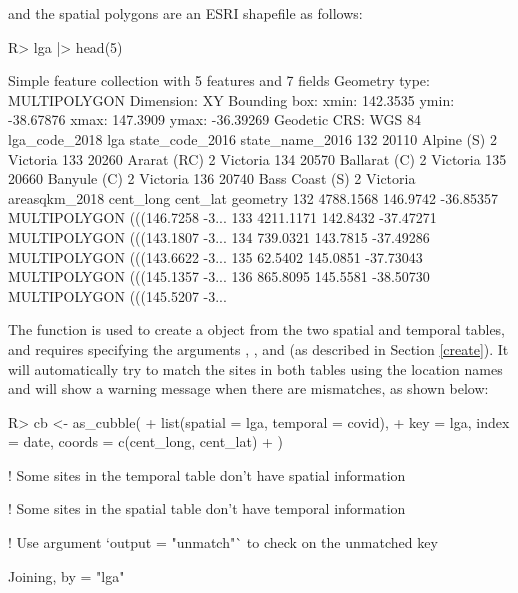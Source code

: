 \documentclass[
  shortnames]{jss}
\begin{document}
and the spatial polygons are an ESRI shapefile as follows:

\begin{CodeChunk}
\begin{CodeInput}
R> lga |> head(5)
\end{CodeInput}
\begin{CodeOutput}
Simple feature collection with 5 features and 7 fields
Geometry type: MULTIPOLYGON
Dimension:     XY
Bounding box:  xmin: 142.3535 ymin: -38.67876 xmax: 147.3909 ymax: -36.39269
Geodetic CRS:  WGS 84
    lga_code_2018            lga state_code_2016 state_name_2016
132         20110     Alpine (S)               2        Victoria
133         20260    Ararat (RC)               2        Victoria
134         20570   Ballarat (C)               2        Victoria
135         20660    Banyule (C)               2        Victoria
136         20740 Bass Coast (S)               2        Victoria
    areasqkm_2018 cent_long  cent_lat                       geometry
132     4788.1568  146.9742 -36.85357 MULTIPOLYGON (((146.7258 -3...
133     4211.1171  142.8432 -37.47271 MULTIPOLYGON (((143.1807 -3...
134      739.0321  143.7815 -37.49286 MULTIPOLYGON (((143.6622 -3...
135       62.5402  145.0851 -37.73043 MULTIPOLYGON (((145.1357 -3...
136      865.8095  145.5581 -38.50730 MULTIPOLYGON (((145.5207 -3...
\end{CodeOutput}
\end{CodeChunk}

The function  is used to create a  object from the two spatial and temporal tables, and requires specifying the arguments , , and  (as described in Section \ref{create}). It will automatically try to match the sites in both tables using the location names and will show a warning message when there are mismatches, as shown below:

\begin{CodeChunk}
\begin{CodeInput}
R> cb <- as_cubble(
+   list(spatial = lga, temporal = covid),
+   key = lga, index = date, coords = c(cent_long, cent_lat)
+   )
\end{CodeInput}
\begin{CodeOutput}
! Some sites in the temporal table don't have spatial information
\end{CodeOutput}
\begin{CodeOutput}
! Some sites in the spatial table don't have temporal information
\end{CodeOutput}
\begin{CodeOutput}
! Use argument `output = "unmatch"` to check on the unmatched key
\end{CodeOutput}
\begin{CodeOutput}
Joining, by = "lga"
\end{CodeOutput}
\end{CodeChunk}
\end{document}

